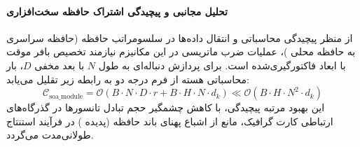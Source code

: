 \paragraph{تحلیل مجانبی و پیچیدگی اشتراک حافظه سخت‌افزاری}
از منظر پیچیدگی محاسباتی و انتقال داده‌ها در سلسومراتب حافظه (حافظه سراسری  به حافظه محلی )، عملیات ضرب ماتریسی در این مکانیزم نیازمند تخصیص بافر موقت با ابعاد فاکتورگیری‌شده است. برای پردازش دنباله‌ای به طول $N$ با بعد مخفی $D$، بار محاسباتی هسته از فرم درجه دو به رابطه زیر تقلیل می‌یابد:
\begin{equation}
\label{eq:complexity_soa_module}
\mathcal{C}_{\text{soa\_module}} = \mathcal{O}\left( B \cdot N \cdot D \cdot r + B \cdot H \cdot N \cdot d_k \right) \ll \mathcal{O}\left( B \cdot H \cdot N^2 \cdot d_k \right)
\end{equation}
این بهبود مرتبه پیچیدگی، با کاهش چشمگیر حجم تبادل تانسورها در گذرگاه‌های ارتباطی کارت گرافیک، مانع از اشباع پهنای باند حافظه (پدیده ) در فرآیند استنتاج طولانی‌مدت می‌گردد.